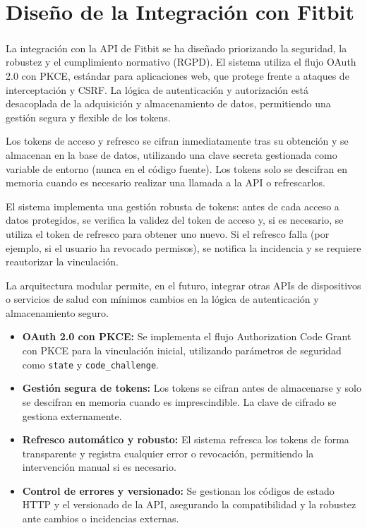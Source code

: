 \section{Diseño de la Integración con Fitbit}
\label{sec:diseno_integracion_fitbit}

La integración con la API de Fitbit\textsuperscript{\textregistered} se ha diseñado priorizando la seguridad, la robustez y el cumplimiento normativo (RGPD). El sistema utiliza el flujo OAuth 2.0 con PKCE, estándar para aplicaciones web, que protege frente a ataques de interceptación y CSRF. La lógica de autenticación y autorización está desacoplada de la adquisición y almacenamiento de datos, permitiendo una gestión segura y flexible de los tokens.

Los tokens de acceso y refresco se cifran inmediatamente tras su obtención y se almacenan en la base de datos, utilizando una clave secreta gestionada como variable de entorno (nunca en el código fuente). Los tokens solo se descifran en memoria cuando es necesario realizar una llamada a la API o refrescarlos.

El sistema implementa una gestión robusta de tokens: antes de cada acceso a datos protegidos, se verifica la validez del token de acceso y, si es necesario, se utiliza el token de refresco para obtener uno nuevo. Si el refresco falla (por ejemplo, si el usuario ha revocado permisos), se notifica la incidencia y se requiere reautorizar la vinculación.

La arquitectura modular permite, en el futuro, integrar otras APIs de dispositivos o servicios de salud con mínimos cambios en la lógica de autenticación y almacenamiento seguro.

\begin{itemize}
    \item \textbf{OAuth 2.0 con PKCE:} Se implementa el flujo Authorization Code Grant con PKCE para la vinculación inicial, utilizando parámetros de seguridad como \texttt{state} y \texttt{code\_challenge}.
    \item \textbf{Gestión segura de tokens:} Los tokens se cifran antes de almacenarse y solo se descifran en memoria cuando es imprescindible. La clave de cifrado se gestiona externamente.
    \item \textbf{Refresco automático y robusto:} El sistema refresca los tokens de forma transparente y registra cualquier error o revocación, permitiendo la intervención manual si es necesario.
    \item \textbf{Control de errores y versionado:} Se gestionan los códigos de estado HTTP y el versionado de la API, asegurando la compatibilidad y la robustez ante cambios o incidencias externas.
\end{itemize}

